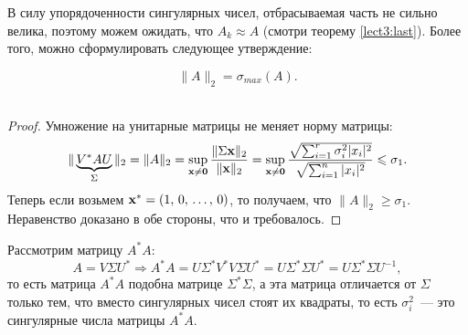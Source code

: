 В силу упорядоченности сингулярных чисел, отбрасываемая часть не сильно велика, поэтому можем ожидать, что $A_k\approx A$ (смотри теорему \ref{lect3:last}).
Более того, можно сформулировать следующее утверждение:

\begin{claim}
    \[
        \|A\|_2=\sigma_{max}(A).
    \]
    \
    \begin{proof}
        Умножение на унитарные матрицы не меняет норму матрицы:
        \[
            \|\underbrace{V^*AU}_{\Sigma}\|_2=\|A\|_2=
            \sup_{\mathbf{x}\neq \mathbf{0}}\dfrac{\|\Sigma \mathbf{x}\|_2}{\|\mathbf{x}\|_2}=\sup_{\mathbf{x}\neq\mathbf{0}}
            \dfrac{\sqrt{\sum_{i = 1}^r\sigma_i^2|x_i|^2}}{\sqrt{\sum_{i=1}^n |x_i|^2}}\leqslant
            \sigma_1.
        \]
        Теперь если возьмем $\mathbf{x^*}=(1,\, 0,\, \ldots,\, 0)$, то получаем, что $\|A\|_2\geqslant\sigma_1$. Неравенство доказано в обе стороны,
        что и требовалось.

    \end{proof}
\end{claim}

\begin{remark}
    Рассмотрим матрицу $A^*A$:
    \[
        A=V\Sigma U^*\Rightarrow A^*A=U\Sigma^*V^*V\Sigma U^*=
        U\Sigma^*\Sigma U^*=U\Sigma^*\Sigma U^{-1},
    \]
    то есть матрица $A^*A$ подобна матрице $\Sigma^*\Sigma$, а эта матрица отличается от $\Sigma$ только тем, что
    вместо сингулярных чисел стоят их квадраты, то есть $\sigma_i^2$~--- это сингулярные числа матрицы $A^* A$.
\end{remark}

